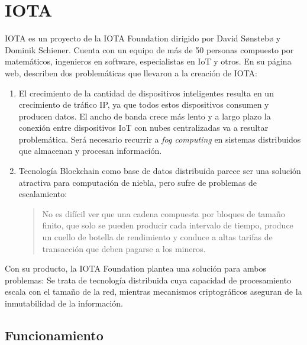 \section{IOTA}
IOTA es un proyecto de la IOTA Foundation dirigido por David Sønstebø y Dominik Schiener. Cuenta con un equipo de más de 50 personas compuesto por matemáticos, ingenieros en software, especialistas en IoT y otros.
En su página web, describen dos problemáticas que llevaron a la creación de IOTA:
\begin{enumerate}
\item El crecimiento de la cantidad de dispositivos inteligentes resulta en un crecimiento de tráfico IP, ya que todos estos dispositivos consumen y producen datos. El ancho de banda crece más lento y a largo plazo la conexión entre dispositivos IoT con nubes centralizadas va a resultar problemática. Será necesario recurrir a \textit{fog computing} en sistemas distribuidos que almacenan y procesan información.
\item Tecnología Blockchain como base de datos distribuida parece ser una solución atractiva para computación de niebla, pero sufre de problemas de escalamiento: 
\begin{quote}
No es difícil ver que una cadena compuesta por bloques de tamaño finito, que solo se pueden producir cada intervalo de tiempo, produce un cuello de botella de rendimiento y conduce a altas tarifas de transacción que deben pagarse a los mineros.\cite{iota_article}
\end{quote}
\end{enumerate}
Con su producto, la IOTA Foundation plantea una solución para ambos problemas: Se trata de tecnología distribuida cuya capacidad de procesamiento escala con el tamaño de la red, mientras mecanismos criptográficos aseguran de la inmutabilidad de la información.

\subsection{Funcionamiento}

